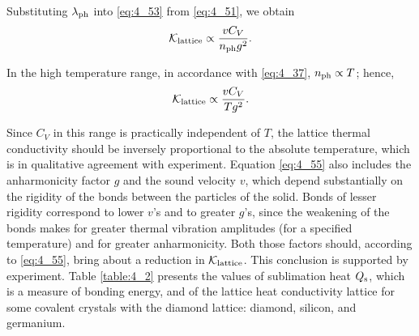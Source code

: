 \noindent
Substituting $\lambda_{\text{ph}}$ into \eqref{eq:4_53} from \eqref{eq:4_51}, we obtain
\begin{equation}\label{eq:4_54}
    \mathcal{K}_{\text{lattice}} \propto \frac{v C_V}{n_{\text{ph}} g^2}.
\end{equation}

In the high temperature range, in accordance with \eqref{eq:4_37}, $n_{\text{ph}}\propto T$; hence,
\begin{equation}\label{eq:4_55}
    \mathcal{K}_{\text{lattice}} \propto \frac{v C_V}{T g^2}.
\end{equation}

Since $C_V$ in this range is practically independent of $T$, the lattice thermal conductivity should be inversely proportional to the absolute temperature, which is in qualitative agreement with experiment. Equation \eqref{eq:4_55} also includes the anharmonicity factor $g$ and the sound velocity $v$, which depend substantially on the rigidity of the bonds between the particles of the solid. Bonds of lesser rigidity correspond to lower $v$'s and to greater $g$'s, since the weakening of the bonds makes for greater thermal vibration amplitudes (for a specified temperature) and for greater anharmonicity. Both those factors should, according to \eqref{eq:4_55}, bring about a reduction in $\mathcal{K}_{\text{lattice}}$. This conclusion is supported by experiment. Table \ref{table:4_2} presents the values of sublimation heat $Q_{\text{s}}$, which is a measure of bonding energy, and of the lattice heat conductivity lattice for some covalent crystals with the diamond lattice: diamond, silicon, and germanium.

\begin{table}[!b]
	\renewcommand{\arraystretch}{1.2}
	\caption{}
	\vspace{-0.6cm}
	\label{table:4_2}
	\begin{center}\end{center}
\end{table}

